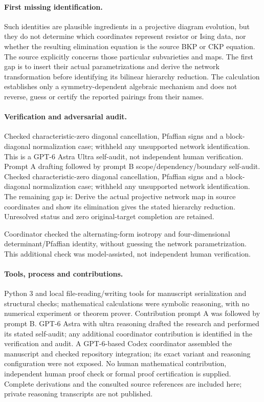 \documentclass[11pt]{article}
\begin{document}
\paragraph{First missing identification.} Such identities are plausible ingredients in a projective diagram evolution, but they do not determine which coordinates represent resistor or Ising data, nor whether the resulting elimination equation is the source BKP or CKP equation. The source explicitly concerns those particular subvarieties and maps. The first gap is to insert their actual parametrizations and derive the network transformation before identifying its bilinear hierarchy reduction. The calculation establishes only a symmetry-dependent algebraic mechanism and does not reverse, guess or certify the reported pairings from their names.

\paragraph{Verification and adversarial audit.}
Checked characteristic-zero diagonal cancellation, Pfaffian signs and a block-diagonal normalization case; withheld any unsupported network identification. This is a GPT-6 Astra Ultra self-audit, not independent human verification. Prompt A drafting followed by prompt B scope/dependency/boundary self-audit. Checked characteristic-zero diagonal cancellation, Pfaffian signs and a block-diagonal normalization case; withheld any unsupported network identification. The remaining gap is: Derive the actual projective network map in source coordinates and show its elimination gives the stated hierarchy reduction. Unresolved status and zero original-target completion are retained.

Coordinator checked the alternating-form isotropy and four-dimensional determinant/Pfaffian identity, without guessing the network parametrization. This additional check was model-assisted, not independent human verification.

\paragraph{Tools, process and contributions.}
Python 3 and local file-reading/writing tools for manuscript serialization and structural checks; mathematical calculations were symbolic reasoning, with no numerical experiment or theorem prover. Contribution prompt A was followed by prompt B. GPT-6 Astra with ultra reasoning drafted the research and performed its stated self-audit; any additional coordinator contribution is identified in the verification and audit. A GPT-6-based Codex coordinator assembled the manuscript and checked repository integration; its exact variant and reasoning configuration were not exposed. No human mathematical contribution, independent human proof check or formal proof certification is supplied. Complete derivations and the consulted source references are included here; private reasoning transcripts are not published.
\end{document}
